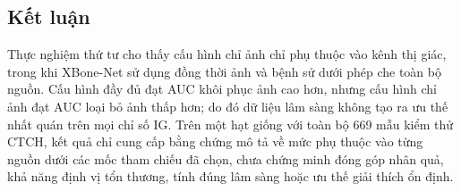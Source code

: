 \subsection{Kết luận}
Thực nghiệm thứ tư cho thấy cấu hình chỉ ảnh chỉ phụ thuộc vào kênh thị giác, trong khi XBone-Net sử dụng đồng thời ảnh và bệnh sử dưới phép che toàn bộ nguồn. Cấu hình đầy đủ đạt AUC khôi phục ảnh cao hơn, nhưng cấu hình chỉ ảnh đạt AUC loại bỏ ảnh thấp hơn; do đó dữ liệu lâm sàng không tạo ra ưu thế nhất quán trên mọi chỉ số IG. Trên một hạt giống với toàn bộ 669 mẫu kiểm thử CTCH, kết quả chỉ cung cấp bằng chứng mô tả về mức phụ thuộc vào từng nguồn dưới các mốc tham chiếu đã chọn, chưa chứng minh đóng góp nhân quả, khả năng định vị tổn thương, tính đúng lâm sàng hoặc ưu thế giải thích ổn định.
